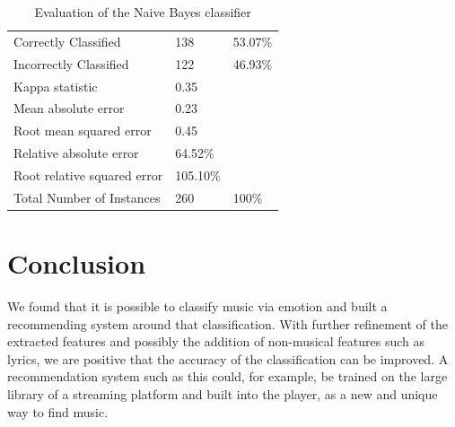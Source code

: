 \documentclass{sigchi-ext}
\begin{document}
\begin{table}
  \centering
  \begin{tabular}{@{}lll@{}}
    Correctly Classified          & 138       & 53.07\% \\
    Incorrectly Classified        & 122       & 46.93\% \\
    Kappa statistic 				      & 0.35      & \\
    Mean absolute error  			    & 0.23      & \\
    Root mean squared error 	    & 0.45      & \\
    Relative absolute error 	    & 64.52\%   & \\
    Root relative squared error   & 105.10\%  & \\
    Total Number of Instances     & 260       & 100\%
  \end{tabular}
  \caption{Evaluation of the Naive Bayes classifier}
\end{table}

\section{Conclusion}
We found that it is possible to classify music via emotion and built a recommending system around that classification. With further refinement of the extracted features and possibly the addition of non-musical features such as lyrics, we are positive that the accuracy of the classification can be improved. A recommendation system such as this could, for example, be trained on the large library of a streaming platform and built into the player, as a new and unique way to find music.



\end{document}
